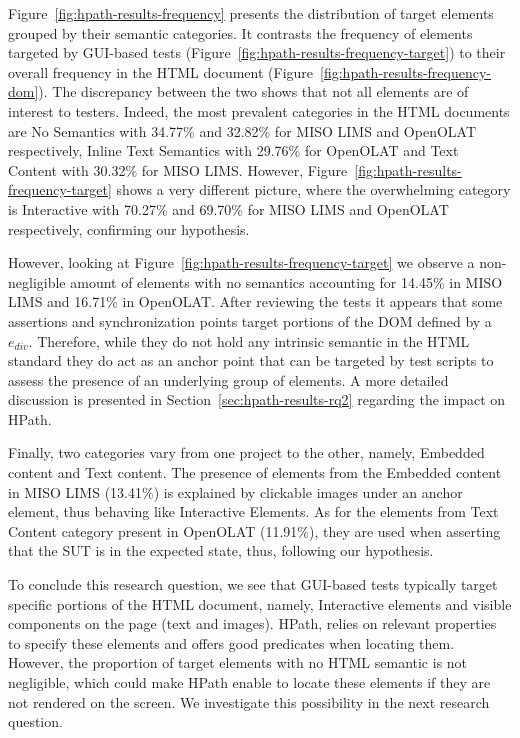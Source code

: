 Figure~\ref{fig:hpath-results-frequency} presents the distribution of target elements grouped by their semantic categories. It contrasts the frequency of elements targeted by GUI-based tests (Figure~\ref{fig:hpath-results-frequency-target}) to their overall frequency in the HTML document (Figure~\ref{fig:hpath-results-frequency-dom}). The discrepancy between the two shows that not all elements are of interest to testers. Indeed, the most prevalent categories in the HTML documents are No Semantics with 34.77\% and 32.82\% for MISO LIMS and OpenOLAT respectively, Inline Text Semantics with 29.76\% for OpenOLAT and Text Content with 30.32\% for MISO LIMS. However, Figure~\ref{fig:hpath-results-frequency-target} shows a very different picture, where the overwhelming category is Interactive with 70.27\% and 69.70\% for MISO LIMS and OpenOLAT respectively, confirming our hypothesis.

However, looking at Figure~\ref{fig:hpath-results-frequency-target} we observe a non-negligible amount of elements with no semantics accounting for 14.45\% in MISO LIMS and 16.71\% in OpenOLAT. After reviewing the tests it appears that some assertions and synchronization points target portions of the DOM defined by a $e_{div}$. Therefore, while they do not hold any intrinsic semantic in the HTML standard they do act as an anchor point that can be targeted by test scripts to assess the presence of an underlying group of elements. A more detailed discussion is presented in Section~\ref{sec:hpath-results-rq2} regarding the impact on HPath.

Finally, two categories vary from one project to the other, namely, Embedded content and Text content. The presence of elements from the Embedded content in MISO LIMS (13.41\%) is explained by clickable images under an anchor element, thus behaving like Interactive Elements. As for the elements from Text Content category present in OpenOLAT (11.91\%), they are used when asserting that the SUT is in the expected state, thus, following our hypothesis.

To conclude this research question, we see that GUI-based tests typically target specific portions of the HTML document, namely, Interactive elements and visible components on the page (text and images). HPath, relies on relevant properties to specify these elements and offers good predicates when locating them. However, the proportion of target elements with no HTML semantic is not negligible, which could make HPath enable to locate these elements if they are not rendered on the screen. We investigate this possibility in the next research question. 


